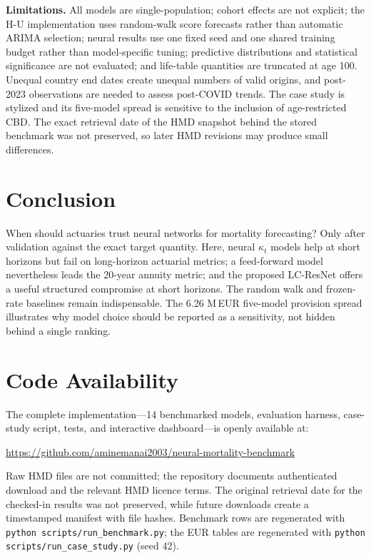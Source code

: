 \documentclass[11pt,a4paper]{article}
\begin{document}
\textbf{Limitations.} All models are single-population; cohort effects are not explicit; the H-U implementation uses random-walk score forecasts rather than automatic ARIMA selection; neural results use one fixed seed and one shared training budget rather than model-specific tuning; predictive distributions and statistical significance are not evaluated; and life-table quantities are truncated at age 100. Unequal country end dates create unequal numbers of valid origins, and post-2023 observations are needed to assess post-COVID trends. The case study is stylized and its five-model spread is sensitive to the inclusion of age-restricted CBD. The exact retrieval date of the HMD snapshot behind the stored benchmark was not preserved, so later HMD revisions may produce small differences.

\section{Conclusion}
\label{sec:conclusion}

When should actuaries trust neural networks for mortality forecasting? Only after validation against the exact target quantity. Here, neural $\kappa_t$ models help at short horizons but fail on long-horizon actuarial metrics; a feed-forward model nevertheless leads the 20-year annuity metric; and the proposed LC-ResNet offers a useful structured compromise at short horizons. The random walk and frozen-rate baselines remain indispensable. The 6.26 M\,EUR five-model provision spread illustrates why model choice should be reported as a sensitivity, not hidden behind a single ranking.

\section*{Code Availability}

The complete implementation---14 benchmarked models, evaluation harness, case-study script, tests, and interactive dashboard---is openly available at:
\begin{center}
\url{https://github.com/aminemanai2003/neural-mortality-benchmark}
\end{center}
Raw HMD files are not committed; the repository documents authenticated download and the relevant HMD licence terms. The original retrieval date for the checked-in results was not preserved, while future downloads create a timestamped manifest with file hashes. Benchmark rows are regenerated with \texttt{python scripts/run\_benchmark.py}; the EUR tables are regenerated with \texttt{python scripts/run\_case\_study.py} (seed 42).
\end{document}
